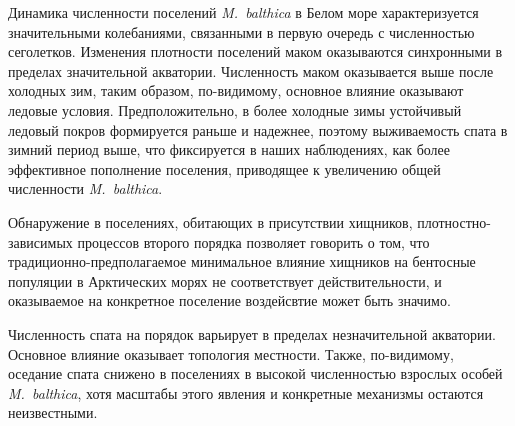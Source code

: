 Динамика численности поселений {\it M.~balthica} в Белом море характеризуется значительными колебаниями, связанными в первую очередь с численностью сеголетков. Изменения плотности поселений маком оказываются синхронными в пределах значительной акватории.
Численность маком оказывается выше после холодных зим, таким образом, по-видимому, основное влияние оказывают ледовые условия.
Предположительно, в более холодные зимы устойчивый ледовый покров формируется раньше и надежнее, поэтому выживаемость спата в зимний период выше, что фиксируется в наших наблюдениях, как более эффективное пополнение поселения, приводящее к увеличению общей численности {\it M.~balthica}.

Обнаружение в поселениях, обитающих в присутствии хищников, плотностно-зависимых процессов второго порядка позволяет говорить о том, что традиционно-предполагаемое минимальное влияние хищников на бентосные популяции в Арктических морях не соответствует действительности, и оказываемое на конкретное поселение воздейсвтие может быть значимо.

Численность спата на порядок варьирует в пределах незначительной акватории.
Основное влияние оказывает топология местности.
Также, по-видимому, оседание спата снижено в поселениях в высокой численностью взрослых особей {\it M.~balthica}, хотя масштабы этого явления и конкретные механизмы остаются неизвестными.


